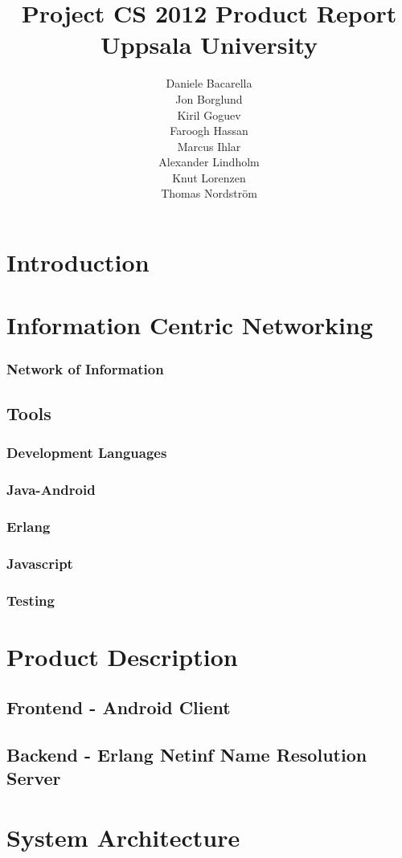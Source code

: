 \documentclass[11pt]{report}
\title{Project CS 2012 Product Report\\Uppsala University\\}
\author{Daniele Bacarella\\
Jon Borglund\\
Kiril Goguev\\
		Faroogh Hassan\\
		Marcus Ihlar\\
		Alexander Lindholm\\
		Knut Lorenzen\\
		Thomas Nordström\\
}
\date{}
\begin{document}
\maketitle

\tableofcontents

\chapter{Introduction}
\chapter{Information Centric Networking}
\subsection{Network of Information}
\section{Tools}
\subsection{Development Languages}
\subsection{Java-Android}
\subsection{Erlang}
\subsection{Javascript}
\subsection{Testing}
\chapter{Product Description}
\section {Frontend - Android Client}
\section {Backend - Erlang Netinf Name Resolution Server}
\chapter{System Architecture}
\end{document}
